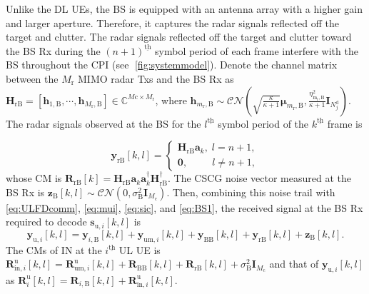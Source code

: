 \documentclass[10pt,journal]{IEEEtran}
\newcommand{\paren}[1]{\left({#1}\right)}
\newcommand{\bracket}[1]{{\left [{#1}\right ]}}
\newcommand{\ith}[1]    {{#1}^{\underline{\text{th}}}}
\newcommand{\rr}{_\mathrm{r}}
\newcommand{\cc}{_\mathrm{c}}
\newcommand{\B}{\textrm{B}}
\theoremstyle{definition}
\begin{document}
Unlike the DL UEs, the BS is equipped with an antenna array with a higher gain and larger aperture. Therefore, it captures the radar signals reflected off the target and clutter. The radar signals reflected off the target and clutter toward the BS Rx during the $\ith{\paren{n+1}}$ symbol period of each frame interfere with the BS throughout the CPI (see \figurename{$\;$\ref{fig:systemmodel}}). Denote the channel matrix between the $\mathit{M}\rr$ MIMO radar Txs and the BS Rx as $\mathbf{H}_{\textrm{rB}}=\bracket{\mathbf{h}_{1,\textrm{B}},\cdots,\mathbf{h}_{\mathit{M}\rr,\textrm{B}}}\in\mathbb{C}^{\mathit{M}\textrm{c}\times \mathit{M}\rr}$, where $\mathbf{h}_{m\rr,\textrm{B}}\sim\mathcal{CN}\paren{\sqrt{\frac{\kappa}{\kappa+1}}\boldsymbol{\mu}_{m\rr,\textrm{B}},\frac{\eta^2_{\mathrm{m\rr},\textrm{B}}}{\kappa+1}\mathbf{I}_{\mathit{N}^{\textrm{d}}_j}}$. The radar signals observed at the BS for the $\ith{l}$ symbol period of the $\ith{k}$ frame is\par\noindent\small
\begin{equation}
    \mathbf{y}_{\textrm{rB}}\bracket{k,l}=
    \begin{cases}
    \mathbf{H}_{\mathrm{rB}}\mathbf{a}_k, \;l=n+1,\\
    \mathbf{0}, \qquad~~ l\neq n+1,
    \end{cases}\label{eq:BS1}
\end{equation}
\normalsize
whose  %
CM is $\mathbf{R}_{\mathrm{rB}}\bracket{k}=\mathbf{H}_{\textrm{rB}}\mathbf{a}_k\mathbf{a}^\dagger_k\mathbf{H}^\dagger_{\textrm{rB}}$. The CSCG noise vector measured at the BS Rx is $\mathbf{z}_\textrm{B}\bracket{k,l}\sim\mathcal{CN}\paren{0,\sigma^2_{\textrm{B}}\mathbf{I}_{M\cc}}$. Then, combining this noise trail with \eqref{eq:ULFDcomm}, \eqref{eq:mui}, \eqref{eq:sic}, and \eqref{eq:BS1}, the received signal at the BS Rx required to decode $\mathbf{s}_{\textrm{u},i}\bracket{k,l}$ is \begin{equation*}
    \mathbf{y}_{\textrm{u},i}\bracket{k,l}=\mathbf{y}_{i,\B}\bracket{k,l}+\mathbf{y}_{\textrm{um},i}\bracket{k,l}+\mathbf{y}_{\textrm{BB}}\bracket{k,l}+\mathbf{y}_{\textrm{rB}}\bracket{k,l}+\mathbf{z}_\textrm{B}\bracket{k,l}.
\end{equation*}
The CMs of IN at the $\ith{i}$ UL UE is $\mathbf{R}^\textrm{u}_{\mathrm{in},i}\bracket{k,l}=\mathbf{R}^\textrm{u}_{\textrm{um}, i}\bracket{k,l}+\mathbf{R}_{\mathrm{BB}}\bracket{k,l}+\mathbf{R}_{\textrm{rB}}\bracket{k,l}+\sigma^2_{\textrm{B}}\mathbf{I}_{\mathit{M}\cc}$ and that of $\mathbf{y}_{\textrm{u},i}\bracket{k,l}$ as $\mathbf{R}^\mathrm{u}_{i}\bracket{k,l}=\mathbf{R}_{i,\B}\bracket{k,l}+\mathbf{R}^\textrm{u}_{\mathrm{in},i}\bracket{k,l}$.  
\end{document}
